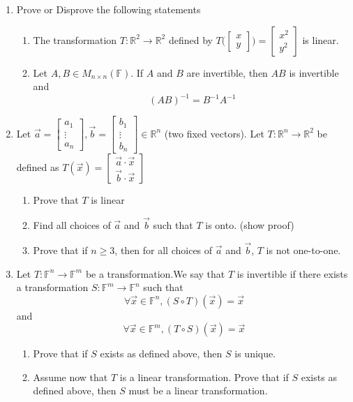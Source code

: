 \documentclass{report}
\newcommand{\R}{{\mathbb{R}}}
\newcommand{\F}{{\mathbb{F}}}
\begin{document}
\begin{enumerate}
\begin{enumerate}
    \end{enumerate}
    \item Prove or Disprove the following statements
    \begin{enumerate}
        \item The transformation $T: \R^2 \to \R^2$ defined by $T \bigg(\begin{bmatrix} x \\ y\end{bmatrix}\bigg) = \begin{bmatrix} x^2 \\ y^2 \end{bmatrix}$ is linear.
        \item Let $A, B \in M_{n \times n}(\F)$. If $ A $ and $ B $ are invertible, then $ AB $ is invertible and 
        $$(AB)^{-1} = B^{-1}A^{-1}$$
    \end{enumerate}
    \item Let $\vec{a} = \begin{bmatrix} a_1 \\ \vdots \\ a_n\end{bmatrix}, \vec{b} = \begin{bmatrix} b_1 \\ \vdots \\ b_n\end{bmatrix} \in \R^n$ (two fixed vectors). Let $T: \R^n \to \R^2$ be defined as $ T(\vec{x}) = \begin{bmatrix} \vec{a} \cdot \vec{x} \\ \vec{b} \cdot \vec{x}\end{bmatrix}$
    \begin{enumerate}
        \item Prove that $ T $ is linear
        \item Find all choices of $\vec{a}$ and $\vec{b}$ such that $T$ is onto. (show proof)
        \item Prove that if $n \ge 3$, then for all choices of $\vec{a}$ and $\vec{b}$, $T$ is not one-to-one.
    \end{enumerate}
    \item Let $T: \F^n \to \F^m$ be a transformation.We say that $T$ is invertible if there exists a transformation $S: \F^m \to \F^n$ such that 
    $$\forall \vec{x} \in \F^n, (S \circ T)(\vec{x}) = \vec{x} $$
    and 
    $$\forall \vec{x} \in \F^m, (T \circ S)(\vec{x}) = \vec{x} $$
    \begin{enumerate}
        \item Prove that if $S$ exists as defined above, then $S$ is unique.
        \item Assume now that $T$ is a linear transformation. Prove that if $S$ exists as defined above, then $S$ must be a linear transformation.
    \end{enumerate}
\end{enumerate}
\end{document}
